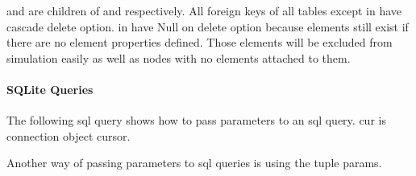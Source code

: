 \documentclass[letterpaper,10pt,english]{sphinxmanual}
\begin{document}
 and  are children of  and  respectively. All foreign keys of all tables except
 in  have cascade delete option.  in  have Null on delete option because
elements still exist if there are no element properties defined. Those elements will be excluded from simulation easily
as well as nodes with no elements attached to them.

\begin{figure}[htbp]
\centering

\noindent{}
\end{figure}


\paragraph{SQLite Queries}
\label{\detokenize{implementation:sqlite-queries}}
The following sql query shows how to pass parameters to an sql query.
cur is connection object cursor.

\begin{sphinxVerbatim}[commandchars=\\\{\}]
 
  
  
  
\end{sphinxVerbatim}

Another way of passing parameters to sql queries is using the tuple params.

\begin{sphinxVerbatim}[commandchars=\\\{\}]
  
  
    
 
\end{sphinxVerbatim}
\end{document}
